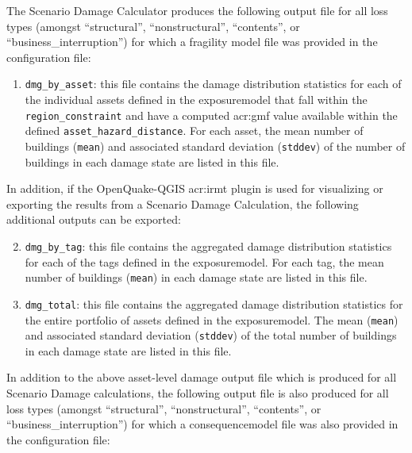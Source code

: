 The Scenario Damage Calculator produces the following output file for
all loss types (amongst ``structural'', ``nonstructural'', ``contents'', or
``business\_interruption'') for which a fragility model file was provided in
the configuration file:

\begin{enumerate}

  \item \Verb+dmg_by_asset+: this file contains the damage distribution
    statistics for each of the individual \glspl{asset} defined in the
    \gls{exposuremodel} that fall within the \Verb+region_constraint+ and have
    a computed \gls{acr:gmf} value available within the defined
    \Verb+asset_hazard_distance+. For each \gls{asset}, the mean number of
    buildings (\Verb+mean+) and associated standard deviation (\Verb+stddev+)
    of the number of buildings in each damage state are listed in this file.

\end{enumerate}

In addition, if the OpenQuake-QGIS \gls{acr:irmt} plugin is used for
visualizing or exporting the results from a Scenario Damage Calculation, the
following additional outputs can be exported:

\begin{enumerate}
\setcounter{enumi}{1}

  \item \Verb+dmg_by_tag+: this file contains the aggregated damage
    distribution statistics for each of the \glspl{tag} defined in the
    \gls{exposuremodel}. For each \gls{tag}, the mean number of
    buildings (\Verb+mean+) in each damage state are listed in this file.

  \item \Verb+dmg_total+: this file contains the aggregated damage
    distribution statistics for the entire portfolio of \glspl{asset} defined
    in the \gls{exposuremodel}. The mean (\Verb+mean+) and associated standard
    deviation (\Verb+stddev+) of the total number of buildings in each
    damage state are listed in this file.

\end{enumerate}

In addition to the above asset-level damage output file which is
produced for all Scenario Damage calculations, the following output file is
also produced for all loss types
(amongst ``structural'', ``nonstructural'', ``contents'', or
``business\_interruption'') for which a \gls{consequencemodel} file was also
provided in the configuration file:

